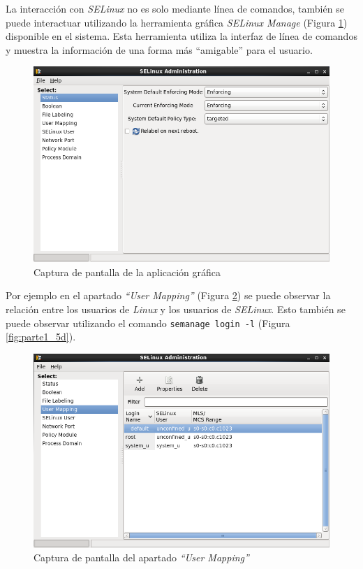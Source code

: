 \documentclass[10pt,a4paper]{article}
\begin{document}
La interacción con \emph{SELinux} no es solo mediante línea de comandos, también se puede interactuar utilizando la herramienta gráfica \emph{SELinux Manage} (Figura \ref{fig:parte1_5a}) disponible en el sistema. Esta herramienta utiliza la interfaz de línea de comandos y muestra la información de una forma más ``amigable'' para el usuario.\\

\begin{figure}[h!]
\centering
\includegraphics[scale=0.5]{images/parte1_5a.png}
\caption{Captura de pantalla de la aplicación gráfica}
\label{fig:parte1_5a}
\end{figure}

Por ejemplo en el apartado \emph{``User Mapping''} (Figura \ref{fig:parte1_5b}) se puede observar la relación entre los usuarios de \emph{Linux} y los usuarios de \emph{SELinux}. Esto también se puede observar utilizando el comando \texttt{semanage login -l} (Figura \ref{fig:parte1_5d}).\\

\begin{figure}[h!]
\centering
\includegraphics[scale=0.5]{images/parte1_5b.png}
\caption{Captura de pantalla del apartado \emph{``User Mapping''}}
\label{fig:parte1_5b}
\end{figure}
\end{document}
